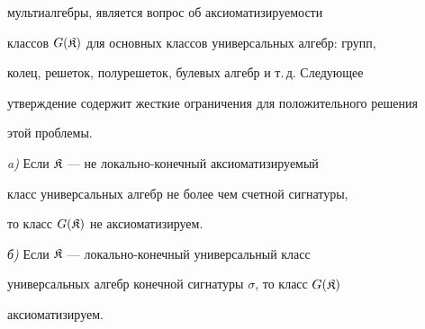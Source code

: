 мультиалгебры, является вопрос об аксиоматизируемости 


классов $G(\frak K)$ для основных классов универсальных алгебр: групп, 


колец, решеток, полурешеток, булевых алгебр и т.\,д. Следующее 


утверждение содержит жесткие ограничения для положительного решения 


этой проблемы. 


 


\begin{thm} 


{\em a)} Если $\frak K$ --- не локально-конечный аксиоматизируемый 


класс универсальных алгебр не более чем счетной сигнатуры, 


то класс $G(\frak K)$ не аксиоматизируем. 


 


{\em б)} Если $\frak K$ --- локально-конечный универсальный класс 


универсальных алгебр конечной сигнатуры $\sigma$, то класс $G(\frak K)$ 


аксиоматизируем. 


\end{thm} 


 


